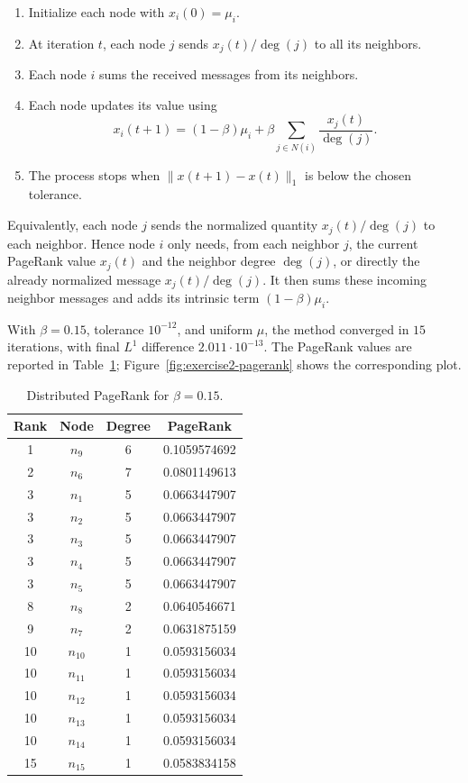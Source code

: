 \documentclass[11pt,a4paper]{article}
\begin{document}
\begin{enumerate}
    \item Initialize each node with $x_i(0)=\mu_i$.
    \item At iteration $t$, each node $j$ sends $x_j(t)/\deg(j)$ to all its neighbors.
    \item Each node $i$ sums the received messages from its neighbors.
    \item Each node updates its value using
    \[
    x_i(t+1)=(1-\beta)\mu_i+\beta\sum_{j\in N(i)}\frac{x_j(t)}{\deg(j)}.
    \]
    \item The process stops when $\|x(t+1)-x(t)\|_1$ is below the chosen tolerance.
\end{enumerate}
Equivalently, each node \(j\) sends the normalized quantity
\(x_j(t)/\deg(j)\) to each neighbor. Hence node \(i\) only needs, from each
neighbor \(j\), the current PageRank value \(x_j(t)\) and the neighbor degree
\(\deg(j)\), or directly the already normalized message \(x_j(t)/\deg(j)\).
It then sums these incoming neighbor messages and adds its intrinsic term
\((1-\beta)\mu_i\).

With \(\beta=0.15\), tolerance \(10^{-12}\), and uniform \(\mu\), the method
converged in \(15\) iterations, with final \(L^1\) difference
\(2.011\cdot 10^{-13}\). The PageRank values are reported in
Table~\ref{tab:exercise2-pagerank}; Figure~\ref{fig:exercise2-pagerank} shows
the corresponding plot.

\begin{table}[h]
\centering
\begin{tabular}{c|c|c|c}
\hline
Rank & Node & Degree & PageRank\\
\hline
1 & \(n_9\) & 6 & 0.1059574692\\
2 & \(n_6\) & 7 & 0.0801149613\\
3 & \(n_1\) & 5 & 0.0663447907\\
3 & \(n_2\) & 5 & 0.0663447907\\
3 & \(n_3\) & 5 & 0.0663447907\\
3 & \(n_4\) & 5 & 0.0663447907\\
3 & \(n_5\) & 5 & 0.0663447907\\
8 & \(n_8\) & 2 & 0.0640546671\\
9 & \(n_7\) & 2 & 0.0631875159\\
10 & \(n_{10}\) & 1 & 0.0593156034\\
10 & \(n_{11}\) & 1 & 0.0593156034\\
10 & \(n_{12}\) & 1 & 0.0593156034\\
10 & \(n_{13}\) & 1 & 0.0593156034\\
10 & \(n_{14}\) & 1 & 0.0593156034\\
15 & \(n_{15}\) & 1 & 0.0583834158\\
\hline
\end{tabular}
\caption{Distributed PageRank for \(\beta=0.15\).}
\label{tab:exercise2-pagerank}
\end{table}
\end{document}
